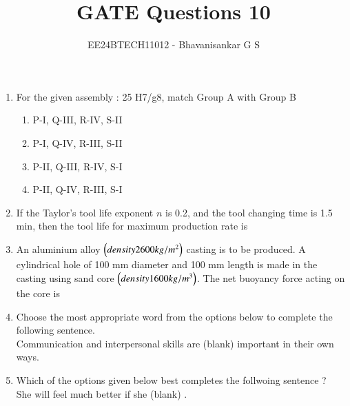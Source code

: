 \documentclass[journal]{IEEEtran}
\begin{document}

\vspace{3cm}

\title{GATE Questions 10}
\author{EE24BTECH11012 - Bhavanisankar G S}
{\let\newpage\relax\maketitle}
\begin{enumerate}
	\item For the given assembly : 25 H7/g8, match Group A with Group B
		
		\begin{enumerate}
			\item P-I, Q-III, R-IV, S-II
			\item P-I, Q-IV, R-III, S-II
			\item P-II, Q-III, R-IV, S-I
			\item P-II, Q-IV, R-III, S-I
		\end{enumerate}
	\item If the Taylor's tool life exponent $n$ is 0.2, and the tool changing time is 1.5 min, then the tool life  for maximum production rate is
	\item An aluminium alloy $\left(density 2600 kg/m^2\right)$ casting is to be produced. A cylindrical hole of 100 mm diameter and 100 mm length is made in the casting using sand core $\left(density 1600 kg/m^3\right)$. The net buoyancy force  acting on the core is
	\item Choose the most appropriate word from the options below to complete the following sentence. \\
		Communication and interpersonal skills are (blank) important in their own ways.
		\begin{enumerate}
		\end{enumerate}
	\item Which of the options given below best completes the follwoing sentence ? \\
		She will feel much better if she (blank) .

\end{enumerate}
\end{document}
